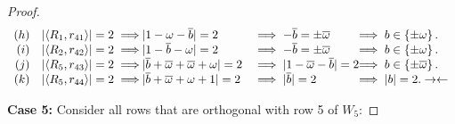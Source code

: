 \begin{lemma}
\begin{proof}
$$\begin{array}{rc@{\hspace{-0.02cm}}ll@{\hspace{-0.1cm}}l}
      (h) & \unb1{41} \implies & |1-\omega-\bar{b}|=2               &\implies -\bar{b} = \pm\bar{\omega}  &\implies b \in \left\{ \pm\omega\right\}.       \\
      (i) & \unb2{42} \implies & |1-\bar{b}-\omega|=2               &\implies -\bar{b} = \pm\bar{\omega}  &\implies b \in \left\{ \pm\omega\right\}.       \\
      (j) & \unb5{43} \implies & |\bar{b}+\bar{\omega}+\bar{\omega}+\omega|=2 &\implies |1-\bar{\omega}-\bar{b}|=2   &\implies b \in \left\{ \pm\bar{\omega}\right\}.  \\
      (k) & \unb5{44} \implies & |\bar{b}+\bar{\omega}+\omega+1|=2       &\implies |\bar{b}|=2            &\implies |b| = 2.   \con
     \end{array}
     $$


    {\bf Case 5:} Consider all rows that are orthogonal with row 5 of $W_5$:


\end{proof}
\end{lemma}
